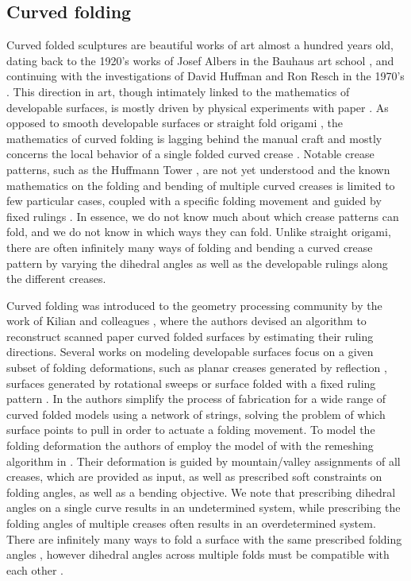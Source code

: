 \subsection{Curved folding}
Curved folded sculptures are beautiful works of art almost a hundred years old, dating back to the 1920's works of Josef Albers in the Bauhaus art school \cite{josef_albers_thesis}, and continuing with the investigations of David Huffman and Ron Resch in the 1970's \cite{huffman,resch1974portfolio}. This direction in art, though intimately linked to the mathematics of developable surfaces, is mostly driven by physical experiments with paper \cite{curved_review}. As opposed to smooth developable surfaces \cite{do_carmo} or straight fold origami \cite{origami_book}, the mathematics of curved folding is lagging behind the manual craft and mostly concerns the local behavior of a single folded curved crease \cite{duncan_folded,mathematical_omnibus,curved_review}. Notable crease patterns, such as the Huffmann Tower \cite{huffman2,huffmann_reconstructing}, are not yet understood \cite{demaine2018conic} and the known mathematics on the folding and bending of multiple curved creases is limited to few particular cases, coupled with a specific folding movement and guided by fixed rulings \cite{demaine_lens, demaine2018conic}. In essence, we do not know much about which crease patterns can fold, and we do not know in which ways they can fold. Unlike straight origami, there are often infinitely many ways of folding and bending a curved crease pattern by varying the dihedral angles as well as the developable rulings along the different creases. 

Curved folding was introduced to the geometry processing community by the work of Kilian and colleagues , where the authors devised an algorithm to reconstruct scanned paper curved folded surfaces by estimating their ruling directions. Several works on modeling developable  surfaces focus on a given subset of folding deformations, such as planar creases generated by reflection \cite{mitani2012column,Mitani_ref}, surfaces generated by rotational sweeps \cite{mitani2009design} or surface folded with a fixed ruling pattern \cite{pottmann_new}. In \cite{StringActuated:2017} the authors simplify the process of fabrication for a wide range of curved folded models using a network of strings, solving the problem of which surface points to pull in order to actuate a folding movement. To model the folding deformation the authors of \cite{StringActuated:2017} employ the model of \cite{botsch2006primo} with the remeshing algorithm in \cite{narain2012adaptive}. Their deformation is guided by mountain/valley assignments of all creases, which are provided as input, as well as prescribed soft constraints on folding angles, as well as a bending objective. We note that prescribing dihedral angles on a single curve results in an undetermined system, while prescribing the folding angles of multiple creases often results in an overdetermined system. There are infinitely many ways to fold a surface with the same prescribed folding angles \cite{more_on_paper,duncan_folded}, however dihedral angles across multiple folds must be compatible with each other \cite{demaine2018conic}. 

